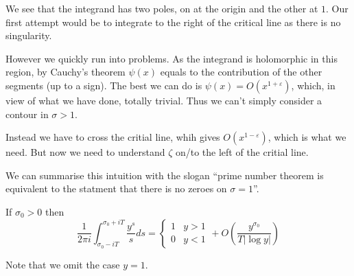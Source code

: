 \documentclass[a4paper]{article}
\theoremstyle{definition}
\begin{document}
We see that the integrand has two poles, on at the origin and the other at \(1\). Our first attempt would be to integrate to the right of the critical line as there is no singularity.
\begin{center}
\end{center}

However we quickly run into problems. As the integrand is holomorphic in this region, by Cauchy's theorem \(\psi(x)\) equals to the contribution of the other segments (up to a sign). The best we can do is \(\psi(x) = O(x^{1 + \varepsilon})\), which, in view of what we have done, totally trivial. Thus we can't simply consider a contour in \(\sigma > 1\).

Instead we have to cross the critial line, whih gives \(O(x^{1 - \varepsilon})\), which is what we need. But now we need to understand \(\zeta\) on/to the left of the critial line.

\begin{center}
\end{center}

We can summarise this intuition with the slogan ``prime number theorem is equivalent to the statment that there is no zeroes on \(\sigma = 1\)''.

\begin{lemma}
  If \(\sigma_0 > 0\) then
  \[
    \frac{1}{2\pi i} \int_{\sigma_0 - iT}^{\sigma_0 + iT} \frac{y^s}{s} ds =
    \begin{cases}
      1 & y > 1 \\
      0 & y < 1
    \end{cases}
    + O(\frac{y^{\sigma_0}}{T |\log y|})
  \]
\end{lemma}
Note that we omit the case \(y = 1\).
\end{document}
